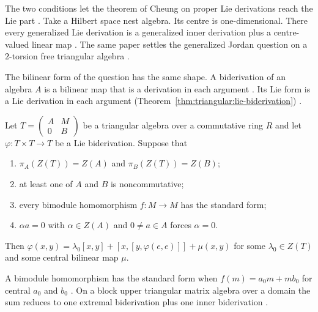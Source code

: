 The two conditions let the theorem of Cheung on proper Lie derivations reach the Lie
part \cite[p.~1541]{Benkovic2011GenLie}. Take a Hilbert space nest algebra. Its
centre is one-dimensional. There every generalized Lie derivation is a
generalized inner derivation plus a centre-valued linear map
\cite[Corollary~3.8, p.~1542]{Benkovic2011GenLie}. The same paper settles the
generalized Jordan question on a $2$-torsion free triangular algebra
\cite[Theorem~4.2, p.~1542]{Benkovic2011GenLie}.

The bilinear form of the question has the same shape. A biderivation of an
algebra $A$ is a bilinear map that is a derivation in each argument
\cite[p.~2]{LiangRenWei2020}. Its Lie form is a Lie derivation in each argument (Theorem~\ref{thm:triangular:lie-biderivation})
\cite[p.~2]{LiangRenWei2020}.\begin{theorem}\label{thm:triangular:lie-biderivation}
Let $T=\begin{pmatrix}A&M\\0&B\end{pmatrix}$ be a triangular algebra over a
commutative ring $R$ and let $\varphi\colon T\times T\to T$ be a Lie
biderivation. Suppose that
\begin{enumerate}
\item $\pi_A(Z(T))=Z(A)$ and $\pi_B(Z(T))=Z(B)$;
\item at least one of $A$ and $B$ is noncommutative;
\item every bimodule homomorphism $f\colon M\to M$ has the standard form;
\item $\alpha a=0$ with $\alpha\in Z(A)$ and $0\neq a\in A$ forces $\alpha=0$.
\end{enumerate}
Then $\varphi(x,y)=\lambda_0[x,y]+[x,[y,\varphi(e,e)]]+\mu(x,y)$ for some
$\lambda_0\in Z(T)$ and some central bilinear map $\mu$.
\end{theorem}

A bimodule homomorphism has the standard form when
$f(m)=a_0m+mb_0$ for central $a_0$ and $b_0$
\cite[equation~(3.3), p.~7]{LiangRenWei2020}. On a block upper triangular matrix
algebra over a domain the sum reduces to one extremal biderivation plus one inner
biderivation \cite[Corollary~3.8, p.~8]{LiangRenWei2020}.

